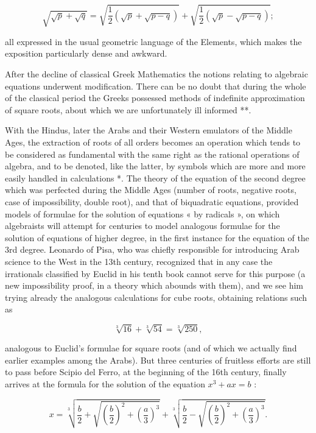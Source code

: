 \[
\sqrt {\sqrt {p} + \sqrt {q}} = \sqrt {\frac {1}{2} (\sqrt {p} + \sqrt {p - q})} + \sqrt {\frac {1}{2} (\sqrt {p} - \sqrt {p - q})};
\]

all expressed in the usual geometric language of the Elements, which makes the exposition particularly dense and awkward.

After the decline of classical Greek Mathematics the notions relating to algebraic equations underwent modification. There can be no doubt that during the whole of the classical period the Greeks possessed methods of indefinite approximation of square roots, about which we are unfortunately ill informed **.

With the Hindus, later the Arabs and their Western emulators of the Middle Ages, the extraction of roots of all orders becomes an operation which tends to be considered as fundamental with the same right as the rational operations of algebra, and to be denoted, like the latter, by symbols which are more and more easily handled in calculations *. The theory of the equation of the second degree which was perfected during the Middle Ages (number of roots, negative roots, case of impossibility, double root), and that of biquadratic equations, provided models of formulae for the solution of equations « by radicals », on which algebraists will attempt for centuries to model analogous formulae for the solution of equations of higher degree, in the first instance for the equation of the 3rd degree. Leonardo of Pisa, who was chiefly responsible for introducing Arab science to the West in the 13th century, recognized that in any case the irrationals classified by Euclid in his tenth book cannot serve for this purpose (a new impossibility proof, in a theory which abounds with them), and we see him trying already the analogous calculations for cube roots, obtaining relations such as

\[
\sqrt [ 3 ]{1 6} + \sqrt [ 3 ]{5 4} = \sqrt [ 3 ]{2 5 0},
\]

analogous to Euclid's formulae for square roots (and of which we actually find earlier examples among the Arabs). But three centuries of fruitless efforts are still to pass before Scipio del Ferro, at the beginning of the 16th century, finally arrives at the formula for the solution of the equation \(x^3 + ax = b\) :

\[
x = \sqrt [ 3 ]{\frac {b}{2} + \sqrt {\left(\frac {b}{2}\right) ^ {2} + \left(\frac {a}{3}\right) ^ {3}}} + \sqrt [ 3 ]{\frac {b}{2} - \sqrt {\left(\frac {b}{2}\right) ^ {2} + \left(\frac {a}{3}\right) ^ {3}}}.\tag{1}
\]

